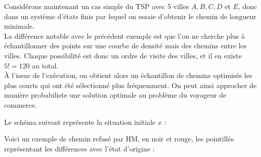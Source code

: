 \documentclass{article}
\begin{document}
\newpage
\begin{tcolorbox}[colback=white,colframe=yellow!80!black,title=Exemple 2, breakable]
Considérons maintenant un cas simple du TSP avec 5 villes $A, B, C, D$ et $E$, donc dans un système d'états finis par lequel on essaie d'obtenir le chemin de longueur minimale. \\
La différence notable avec le précédent exemple est que l'on ne cherche plus à échantillonner des points sur une courbe de densité mais des chemins entre les villes. Chaque possibilité est donc un ordre de visite des villes, et il en existe $5! = 120$ au total. \\
À l'issue de l'exécution, on obtient alors un échantillon de chemins optimisés les plus courts qui ont été sélectionné plus fréquemment. On peut ainsi approcher de manière probabiliste une solution optimale au problème du voyageur de commerce.

Le schéma suivant représente la situation initiale $x$ :
\begin{center}
\end{center}

Voici un exemple de chemin refusé par HM, en noir et rouge, les pointillés représentant les différences avec l'état d'origine :
\begin{center}
\end{center}


\end{tcolorbox}
\end{document}
